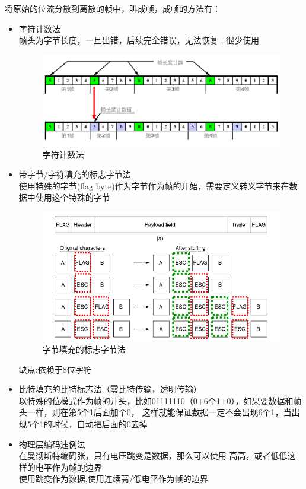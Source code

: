 \documentclass[UTF8,a4paper]{ctexart}
\begin{document}
  将原始的位流分散到离散的帧中，叫成帧，成帧的方法有：
  \begin{itemize}
    \item 字符计数法\\
    	帧头为字节长度，一旦出错，后续完全错误，无法恢复 , 很少使用
      \begin{figure}[H]
        \centering
        \includegraphics[scale = 0.3]{assets/jisuanjiwangluo_d37e3.png}
        \caption{字符计数法}
      \end{figure}
    \item 带字节/字符填充的标志字节法\\
    	使用特殊的字节(flag byte)作为字节作为帧的开始，需要定义转义字节来在数据中使用这个特殊的字节
      \begin{figure}[H]
        \centering
        \includegraphics[scale = 0.3]{assets/jisuanjiwangluo_877b1.png}
        \caption{字节填充的标志字节法}
      \end{figure}
      缺点:依赖于8位字符
    \item  比特填充的比特标志法（零比特传输，透明传输）\\
    	以特殊的位模式作为帧的开头，比如01111110（0+6个1+0），如果要数据和帧头一样，则在第5个1后面加个0，
    	这样就能保证数据一定不会出现6个1，当出现5个1的时候，自动把后面的0去掉
    \item 物理层编码违例法\\
    	在曼彻斯特编码张，只有电压跳变是数据，那么可以使用 高高，或者低低这样的电平作为帧的边界\\
      使用跳变作为数据,使用连续高/低电平作为帧的边界
  \end{itemize}
\end{document}
